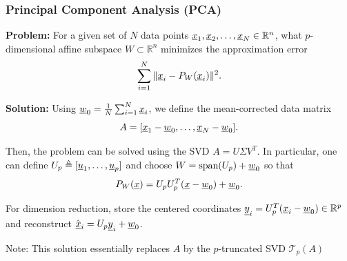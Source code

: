 \documentclass[10pt,english,aspectratio=169]{beamer}
\begin{document}
\begin{frame} \frametitle{Principal Component Analysis (PCA)}

\textbf{Problem:} For a given set of $N$ data points $\underline x_{1},\underline x_{2},\ldots,\underline x_{N}\in\mathbb{R}^{n}$, what $p$-dimensional affine subspace $W\subset\mathbb{R}^{n}$ minimizes the approximation error \vspace{-1.5mm}
\[
\sum_{i=1}^{N}\|\underline x_{i}-P_{W}(\underline x_{i})\|^{2}.
\]

\vspace{-1.5mm}

\textbf{Solution:} Using $\underline w_{0}=\frac{1}{N}\sum_{i=1}^{N}\underline x_{i}$, we define the mean-corrected data matrix \vspace{-1.5mm}
\[ A=[\underline x_{1}-\underline w_{0},\ldots,\underline x_{N}-\underline w_{0}]. \]

\vspace{-1mm}

Then, the problem can be solved using the SVD $A=U\Sigma V^{T}$.
In particular, one can define $U_{p}\triangleq[\underline u_{1},\ldots,\underline u_{p}]$ and choose $W = \textrm{span}(U_p) + \underline{w}_0$ so that \vspace{-1.5mm}
\[ P_{W}(\underline x)=U_{p}U_{p}^{T}(\underline x-\underline w_{0})+\underline w_{0} . \]

\vspace{-1mm}

For dimension reduction, store the centered coordinates $\underline y_i=U_p^T(\underline x_i-\underline w_0)\in\mathbb{R}^p$ and reconstruct $\hat{\underline x}_i=U_p\underline y_i+\underline w_0$.

\vspace{4mm}

Note: This solution essentially replaces $A$ by the $p$-truncated SVD $\mathcal{T}_p (A)$

%
 


\end{frame}
\end{document}
